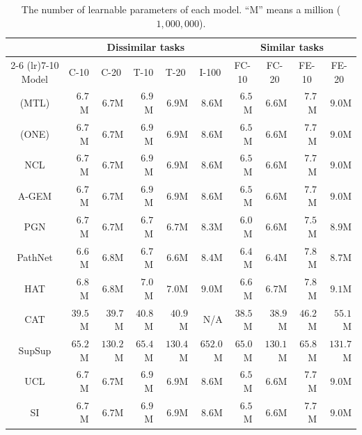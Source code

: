 \begin{table}[ht]
\centering
\caption{
The number of learnable parameters of each model. 
``M'' means a million ($1,000,000$).
}
\label{tab:app_network_size}
\begin{tabular}{crrrrrrrrr}
\toprule
& \multicolumn{5}{c}{Dissimilar tasks} & \multicolumn{4}{c}{Similar tasks} \\
\cmidrule(lr){2-6} \cmidrule(lr){7-10}
Model & \multicolumn{1}{c}{C-10} & \multicolumn{1}{c}{C-20} & \multicolumn{1}{c}{T-10} & \multicolumn{1}{c}{T-20} & \multicolumn{1}{c}{I-100} &
\multicolumn{1}{c}{FC-10} & \multicolumn{1}{c}{FC-20} & \multicolumn{1}{c}{FE-10} & \multicolumn{1}{c}{FE-20} \\
\midrule

(MTL) & 
$6.7$M & $6.7$M & 
$6.9$M & $6.9$M &
$8.6$M & 
$6.5$M & $6.6$M &
$7.7$M & $9.0$M \\

(ONE) &
$6.7$M & $6.7$M & 
$6.9$M & $6.9$M &
$8.6$M & 
$6.5$M & $6.6$M &
$7.7$M & $9.0$M \\

\hdashline

NCL &
$6.7$M & $6.7$M & 
$6.9$M & $6.9$M &
$8.6$M & 
$6.5$M & $6.6$M &
$7.7$M & $9.0$M \\

A-GEM &
$6.7$M & $6.7$M & 
$6.9$M & $6.9$M &
$8.6$M & 
$6.5$M & $6.6$M &
$7.7$M & $9.0$M \\

PGN &
$6.7$M & $6.7$M &
$6.7$M & $6.7$M &
$8.3$M & 
$6.0$M & $6.6$M &
$7.5$M & $8.9$M \\

PathNet &
$6.6$M & $6.8$M & 
$6.7$M & $6.6$M &
$8.4$M & %
$6.4$M & $6.4$M &
$7.8$M & $8.7$M \\

HAT &
$6.8$M & $6.8$M &
$7.0$M & $7.0$M &
$9.0$M & 
$6.6$M & $6.7$M &
$7.8$M & $9.1$M \\

CAT &
$39.5$M & $39.7$M &
$40.8$M & $40.9$M &
N/A & 
$38.5$M & $38.9$M &
$46.2$M & $55.1$M \\

SupSup &
$65.2$M & $130.2$M &
$65.4$M & $130.4$M &
$652.0$M &
$65.0$M & $130.1$M &
$65.8$M & $131.7$M \\

UCL &
$6.7$M & $6.7$M &
$6.9$M & $6.9$M &
$8.6$M &
$6.5$M & $6.6$M &
$7.7$M & $9.0$M \\

SI &
$6.7$M & $6.7$M & 
$6.9$M & $6.9$M &
$8.6$M & 
$6.5$M & $6.6$M &
$7.7$M & $9.0$M \\


\end{tabular}
\end{table}
